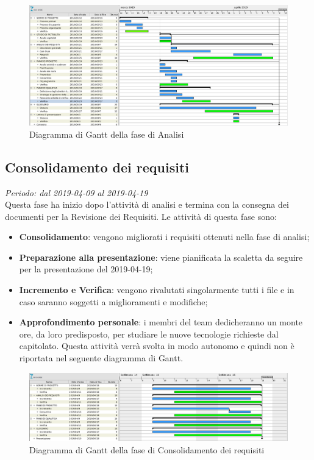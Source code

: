 \begin{figure}[H]
	\includegraphics[width=0.99\linewidth]{res/images/gantt_analisi.png}
	\caption{Diagramma di Gantt della fase di Analisi}
\end{figure}

\subsection{Consolidamento dei requisiti}
\textit{Periodo: dal 2019-04-09 al 2019-04-19} \\
Questa fase ha inizio dopo l'attività di analisi e termina con la consegna dei documenti per la Revisione dei Requisiti. Le attività 
di questa fase sono:
\begin{itemize}
	\item \textbf{Consolidamento}: vengono migliorati i requisiti ottenuti nella fase di analisi;
	\item \textbf{Preparazione alla presentazione}: viene pianificata la scaletta da seguire per la presentazione del 2019-04-19;
	\item \textbf{Incremento e Verifica}: vengono rivalutati singolarmente tutti i file e in caso saranno soggetti a miglioramenti e modifiche;
	\item \textbf{Approfondimento personale}: i membri del team dedicheranno un monte ore, da loro predisposto, per studiare le nuove tecnologie richieste dal capitolato\glo. Questa attività verrà svolta in modo autonomo e quindi non è riportata nel seguente diagramma di Gantt\glo.
\end{itemize}

\begin{figure}[H]
	\includegraphics[width=0.99\linewidth]{res/images/gantt_cons.png}
	\caption{Diagramma di Gantt della fase di Consolidamento dei requisiti}
\end{figure}


